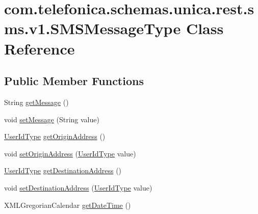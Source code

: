 \hypertarget{classcom_1_1telefonica_1_1schemas_1_1unica_1_1rest_1_1sms_1_1v1_1_1SMSMessageType}{
\section{com.telefonica.schemas.unica.rest.sms.v1.SMSMessageType Class Reference}
\label{classcom_1_1telefonica_1_1schemas_1_1unica_1_1rest_1_1sms_1_1v1_1_1SMSMessageType}
}
\subsection*{Public Member Functions}
\begin{DoxyCompactItemize}
\item 
String \hyperlink{classcom_1_1telefonica_1_1schemas_1_1unica_1_1rest_1_1sms_1_1v1_1_1SMSMessageType_a82334d1422b65afa0f33a2b6e93d2a36}{getMessage} ()
\item 
void \hyperlink{classcom_1_1telefonica_1_1schemas_1_1unica_1_1rest_1_1sms_1_1v1_1_1SMSMessageType_a98c71432191bcdaeaa4c11b6693ab95d}{setMessage} (String value)
\item 
\hyperlink{classcom_1_1telefonica_1_1schemas_1_1unica_1_1rest_1_1common_1_1v1_1_1UserIdType}{UserIdType} \hyperlink{classcom_1_1telefonica_1_1schemas_1_1unica_1_1rest_1_1sms_1_1v1_1_1SMSMessageType_af6a2fed55b35a50893eb2133680f0801}{getOriginAddress} ()
\item 
void \hyperlink{classcom_1_1telefonica_1_1schemas_1_1unica_1_1rest_1_1sms_1_1v1_1_1SMSMessageType_ad3ef07566b6217282c48d651e6d780d8}{setOriginAddress} (\hyperlink{classcom_1_1telefonica_1_1schemas_1_1unica_1_1rest_1_1common_1_1v1_1_1UserIdType}{UserIdType} value)
\item 
\hyperlink{classcom_1_1telefonica_1_1schemas_1_1unica_1_1rest_1_1common_1_1v1_1_1UserIdType}{UserIdType} \hyperlink{classcom_1_1telefonica_1_1schemas_1_1unica_1_1rest_1_1sms_1_1v1_1_1SMSMessageType_a43730c4dda77b3be1aecd8ce9682c476}{getDestinationAddress} ()
\item 
void \hyperlink{classcom_1_1telefonica_1_1schemas_1_1unica_1_1rest_1_1sms_1_1v1_1_1SMSMessageType_ad5efbfa56ac54ee9fbd4343a7c7af2b6}{setDestinationAddress} (\hyperlink{classcom_1_1telefonica_1_1schemas_1_1unica_1_1rest_1_1common_1_1v1_1_1UserIdType}{UserIdType} value)
\item 
XMLGregorianCalendar \hyperlink{classcom_1_1telefonica_1_1schemas_1_1unica_1_1rest_1_1sms_1_1v1_1_1SMSMessageType_aec92585ac4b3bcb10c4cbd21292106fc}{getDateTime} ()

\end{DoxyCompactItemize}
